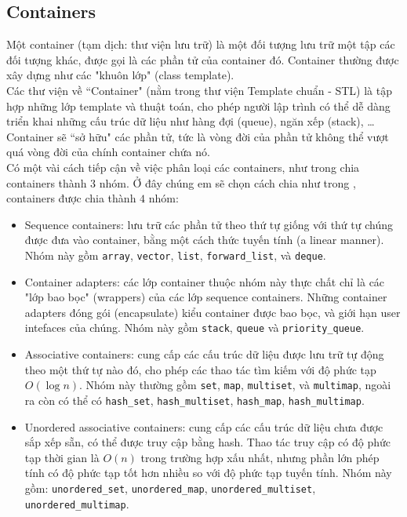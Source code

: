 \subsection{Containers}
\label{contain}
Một container (tạm dịch: thư viện lưu trữ) là một đối tượng lưu trữ một tập các đối tượng khác, được gọi là các phần tử của container đó. Container thường được xây dựng như các "khuôn lớp" (class template).\\
Các thư viện về “Container" (nằm trong thư viện Template chuẩn - STL) là tập hợp những lớp template và thuật toán, cho phép người lập trình có thể dễ dàng triển khai những cấu trúc dữ liệu như hàng đợi (queue),  ngăn xếp (stack), …\\
Container sẽ “sở hữu" các phần tử, tức là vòng đời của phần tử không thể vượt quá vòng đời của chính container chứa nó.\\
Có một vài cách tiếp cận về việc phân loại các containers, như trong \cite{tdtfit} chia containers thành $3$ nhóm. Ở đây chúng em sẽ chọn cách chia như trong \cite{container}, containers được chia thành $4$ nhóm:
\begin{itemize}
    \item Sequence containers: lưu trữ các phần tử theo thứ tự giống với thứ tự chúng được đưa vào container, bằng một cách thức tuyến tính (a linear manner). Nhóm này gồm \lstinline{array}, \lstinline{vector}, \lstinline{list}, \lstinline{forward_list}, và \lstinline{deque}.
    \item Container adapters: các lớp container thuộc nhóm này thực chất chỉ là các "lớp bao bọc" (wrappers) của các lớp sequence containers. Những container adapters đóng gói (encapsulate) kiểu container được bao bọc, và giới hạn user intefaces của chúng. Nhóm này gồm \lstinline{stack}, \lstinline{queue} và \lstinline{priority_queue}.
    \item Associative containers: cung cấp các cấu trúc dữ liệu được lưu trữ tự động theo một thứ tự nào đó, cho phép các thao tác tìm kiếm với độ phức tạp $O \left( {\log n} \right).$ Nhóm này thường gồm \lstinline{set}, \lstinline{map}, \lstinline{multiset}, và \lstinline{multimap}, ngoài ra còn có thể có \lstinline{hash_set}, \lstinline{hash_multiset}, \lstinline{hash_map}, \lstinline{hash_multimap}. \cite{tdtfit}
    \item Unordered associative containers: cung cấp các cấu trúc dữ liệu chưa được sắp xếp sẵn, có thể được truy cập bằng hash. Thao tác truy cập có độ phức tạp thời gian là $O \left( n \right)$ trong trường hợp xấu nhất, nhưng phần lớn phép tính có độ phức tạp tốt hơn nhiều so với độ phức tạp tuyến tính. \cite{container} Nhóm này gồm: \lstinline{unordered_set}, \lstinline{unordered_map}, \lstinline{unordered_multiset}, \lstinline{unordered_multimap}.
\end{itemize}
